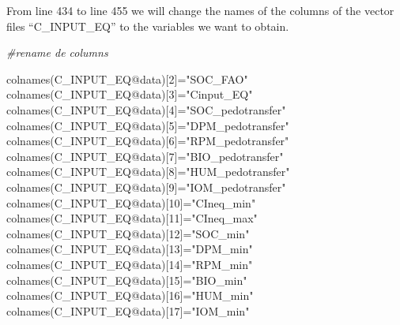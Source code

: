 \documentclass[
  10pt,
  b5paper,
]{book}
\newenvironment{Shaded}{\begin{snugshade}}{\end{snugshade}}
\newcommand{\CommentTok}[1]{\textcolor[rgb]{0.56,0.35,0.01}{\textit{#1}}}
\newcommand{\DecValTok}[1]{\textcolor[rgb]{0.00,0.00,0.81}{#1}}
\newcommand{\FunctionTok}[1]{\textcolor[rgb]{0.00,0.00,0.00}{#1}}
\newcommand{\NormalTok}[1]{#1}
\newcommand{\OtherTok}[1]{\textcolor[rgb]{0.56,0.35,0.01}{#1}}
\newcommand{\SpecialCharTok}[1]{\textcolor[rgb]{0.00,0.00,0.00}{#1}}
\newcommand{\StringTok}[1]{\textcolor[rgb]{0.31,0.60,0.02}{#1}}
\begin{document}
From line 434 to line 455 we will change the names of the columns of the vector files ``C\_INPUT\_EQ'' to the variables we want to obtain.

\begin{Shaded}
\begin{Highlighting}[]
\CommentTok{\#rename de columns}

\FunctionTok{colnames}\NormalTok{(C\_INPUT\_EQ}\SpecialCharTok{@}\NormalTok{data)[}\DecValTok{2}\NormalTok{]}\OtherTok{=}\StringTok{"SOC\_FAO"}
\FunctionTok{colnames}\NormalTok{(C\_INPUT\_EQ}\SpecialCharTok{@}\NormalTok{data)[}\DecValTok{3}\NormalTok{]}\OtherTok{=}\StringTok{"Cinput\_EQ"}
\FunctionTok{colnames}\NormalTok{(C\_INPUT\_EQ}\SpecialCharTok{@}\NormalTok{data)[}\DecValTok{4}\NormalTok{]}\OtherTok{=}\StringTok{"SOC\_pedotransfer"}
\FunctionTok{colnames}\NormalTok{(C\_INPUT\_EQ}\SpecialCharTok{@}\NormalTok{data)[}\DecValTok{5}\NormalTok{]}\OtherTok{=}\StringTok{"DPM\_pedotransfer"}
\FunctionTok{colnames}\NormalTok{(C\_INPUT\_EQ}\SpecialCharTok{@}\NormalTok{data)[}\DecValTok{6}\NormalTok{]}\OtherTok{=}\StringTok{"RPM\_pedotransfer"}
\FunctionTok{colnames}\NormalTok{(C\_INPUT\_EQ}\SpecialCharTok{@}\NormalTok{data)[}\DecValTok{7}\NormalTok{]}\OtherTok{=}\StringTok{"BIO\_pedotransfer"}
\FunctionTok{colnames}\NormalTok{(C\_INPUT\_EQ}\SpecialCharTok{@}\NormalTok{data)[}\DecValTok{8}\NormalTok{]}\OtherTok{=}\StringTok{"HUM\_pedotransfer"}
\FunctionTok{colnames}\NormalTok{(C\_INPUT\_EQ}\SpecialCharTok{@}\NormalTok{data)[}\DecValTok{9}\NormalTok{]}\OtherTok{=}\StringTok{"IOM\_pedotransfer"}
\FunctionTok{colnames}\NormalTok{(C\_INPUT\_EQ}\SpecialCharTok{@}\NormalTok{data)[}\DecValTok{10}\NormalTok{]}\OtherTok{=}\StringTok{"CIneq\_min"}
\FunctionTok{colnames}\NormalTok{(C\_INPUT\_EQ}\SpecialCharTok{@}\NormalTok{data)[}\DecValTok{11}\NormalTok{]}\OtherTok{=}\StringTok{"CIneq\_max"}
\FunctionTok{colnames}\NormalTok{(C\_INPUT\_EQ}\SpecialCharTok{@}\NormalTok{data)[}\DecValTok{12}\NormalTok{]}\OtherTok{=}\StringTok{"SOC\_min"}
\FunctionTok{colnames}\NormalTok{(C\_INPUT\_EQ}\SpecialCharTok{@}\NormalTok{data)[}\DecValTok{13}\NormalTok{]}\OtherTok{=}\StringTok{"DPM\_min"}
\FunctionTok{colnames}\NormalTok{(C\_INPUT\_EQ}\SpecialCharTok{@}\NormalTok{data)[}\DecValTok{14}\NormalTok{]}\OtherTok{=}\StringTok{"RPM\_min"}
\FunctionTok{colnames}\NormalTok{(C\_INPUT\_EQ}\SpecialCharTok{@}\NormalTok{data)[}\DecValTok{15}\NormalTok{]}\OtherTok{=}\StringTok{"BIO\_min"}
\FunctionTok{colnames}\NormalTok{(C\_INPUT\_EQ}\SpecialCharTok{@}\NormalTok{data)[}\DecValTok{16}\NormalTok{]}\OtherTok{=}\StringTok{"HUM\_min"}
\FunctionTok{colnames}\NormalTok{(C\_INPUT\_EQ}\SpecialCharTok{@}\NormalTok{data)[}\DecValTok{17}\NormalTok{]}\OtherTok{=}\StringTok{"IOM\_min"}

\end{Highlighting}
\end{Shaded}
\end{document}
